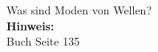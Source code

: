 \begin{question}[section=5,subsection=52,name={Moden von Wellen},difficulty=7,type=mdl,tags={}]
	Was sind Moden von Wellen?
	\\ \textbf{Hinweis:}\\
	Buch Seite 135
\end{question}
\begin{solution}
	
\end{solution}